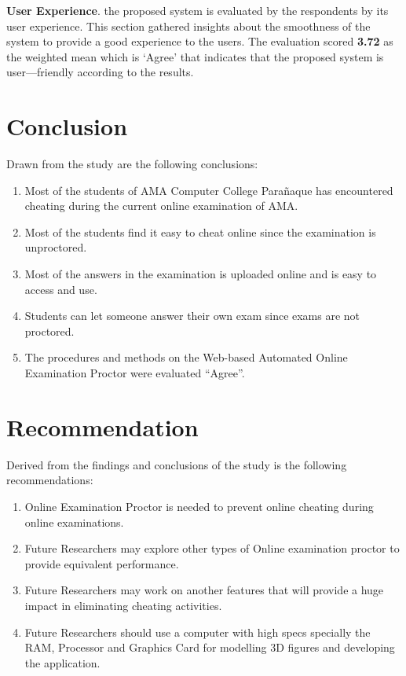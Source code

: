 \textbf{User Experience}.
the proposed system is evaluated by the respondents by its user experience.
This section gathered insights about the smoothness of the system to provide a good experience to the users.
The evaluation scored \textbf{3.72} as the weighted mean which is ‘Agree’ that indicates that the proposed system is user—friendly according to the results.

\section{Conclusion}

Drawn from the study are the following conclusions:

\begin{enumerate}
   \item Most of the students of AMA Computer College Parañaque has encountered cheating during the current online examination of AMA.
   \item Most of the students find it easy to cheat online since the examination is unproctored.
   \item Most of the answers in the examination is uploaded online and is easy to access and use.
   \item Students can let someone answer their own exam since exams are not proctored.
   \item The procedures and methods on the Web-based Automated Online Examination Proctor were evaluated “Agree”.
\end{enumerate}

\section{Recommendation}

Derived from the findings and conclusions of the study is the following recommendations:

\begin{enumerate}
   \item Online Examination Proctor is needed to prevent online cheating during online examinations.
   \item Future Researchers may explore other types of Online examination proctor to provide equivalent performance.
   \item Future Researchers may work on another features that will provide a huge impact in eliminating cheating activities.
   \item Future Researchers should use a computer with high specs specially the RAM, Processor and Graphics Card for modelling 3D figures and developing the application.
\end{enumerate}
